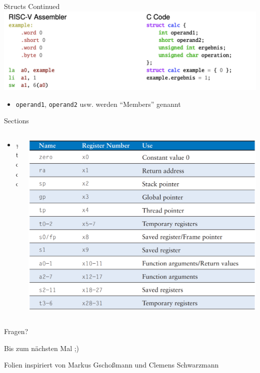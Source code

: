 \documentclass[
  german,            %
  aspectratio=169,    %
]{tumbeamer}
\begin{document}
\begin{frame}[c]{Structs Continued}{}
  \includegraphics[width=\linewidth]{strutcs_comparison.png}
  \begin{itemize}
    \item \texttt{operand1}, \texttt{operand2} usw. werden \enquote{Members} genannt
  \end{itemize}
\end{frame}

\begin{frame}[c]{Sections}{}
  \begin{columns}[c]
    \begin{column}{0.5\textwidth}
      \begin{itemize}
        \item \#todo
      \end{itemize}
    \end{column}
    \begin{column}{0.5\textwidth}
      \includegraphics[width=\linewidth]{riscv_registers.png}
    \end{column}
  \end{columns}
\end{frame}

\begin{frame}[c]{}{}
  \begin{center}
    \LARGE Fragen?
  \end{center}
  \vspace{0.5cm}
  \begin{center}
    \LARGE Bis zum nächsten Mal ;) \\
  \end{center}
  \vspace{1.0cm}
  \begin{center}
    \small Folien inspiriert von Markus Gschoßmann und Clemens Schwarzmann
  \end{center}
\end{frame}
\end{document}
